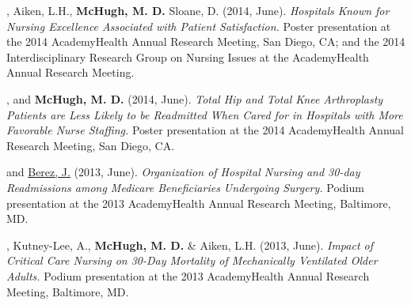 \documentclass[10pt,]{article}
\begin{document}
{{{{{{{{{{{{{{{\vspace{4mm}

\begin{hangparas}{.25in}{1}

, Aiken, L.H., {\textbf {McHugh, M. D.}} Sloane, D. (2014, June). {\textit {Hospitals Known for Nursing Excellence Associated with Patient Satisfaction.}} Poster presentation at the 2014 AcademyHealth Annual Research Meeting, San Diego, CA; and the 2014 Interdisciplinary Research Group on Nursing Issues at the AcademyHealth Annual Research Meeting.

\end{hangparas}

\vspace{4mm}

\begin{hangparas}{.25in}{1}

, and {\textbf {McHugh, M. D.}} (2014, June). {\textit {Total Hip and Total Knee Arthroplasty Patients are Less Likely to be Readmitted When Cared for in Hospitals with More Favorable Nurse Staffing.}} Poster presentation at the 2014 AcademyHealth Annual Research Meeting, San Diego, CA.

\end{hangparas}

\vspace{4mm}

\begin{hangparas}{.25in}{1}

 and {\underline {Berez, J.}} (2013, June). {\textit {Organization of Hospital Nursing and 30-day Readmissions among Medicare Beneficiaries Undergoing Surgery.}} Podium presentation at the 2013 AcademyHealth Annual Research Meeting, Baltimore, MD.

\end{hangparas}

\vspace{4mm}

\begin{hangparas}{.25in}{1}

, Kutney-Lee, A., {\textbf {McHugh, M. D.}} \& Aiken, L.H. (2013, June). {\textit {Impact of Critical Care Nursing on 30-Day Mortality of Mechanically Ventilated Older Adults.}} Podium presentation at the 2013 AcademyHealth Annual Research Meeting, Baltimore, MD.

\end{hangparas}

}}}}}}}}}}}}}}}
\end{document}
